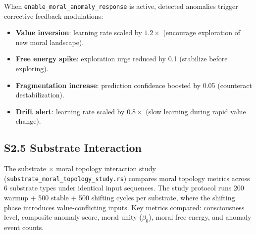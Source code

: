 \documentclass[10pt,landscape]{article}
\begin{document}
When \texttt{enable\_moral\_anomaly\_response} is active, detected anomalies trigger corrective feedback modulations:

\begin{itemize}
  \item \textbf{Value inversion}: learning rate scaled by $1.2\times$ (encourage exploration of new moral landscape).
  \item \textbf{Free energy spike}: exploration urge reduced by 0.1 (stabilize before exploring).
  \item \textbf{Fragmentation increase}: prediction confidence boosted by 0.05 (counteract destabilization).
  \item \textbf{Drift alert}: learning rate scaled by $0.8\times$ (slow learning during rapid value change).
\end{itemize}

\subsection*{S2.5 Substrate Interaction}

The substrate $\times$ moral topology interaction study (\texttt{substrate\_moral\_topology\_study.rs}) compares moral topology metrics across 6 substrate types under identical input sequences.  The study protocol runs 200 warmup + 500 stable + 500 shifting cycles per substrate, where the shifting phase introduces value-conflicting inputs.  Key metrics compared: consciousness level, composite anomaly score, moral unity ($\beta_0$), moral free energy, and anomaly event counts.



\end{document}
